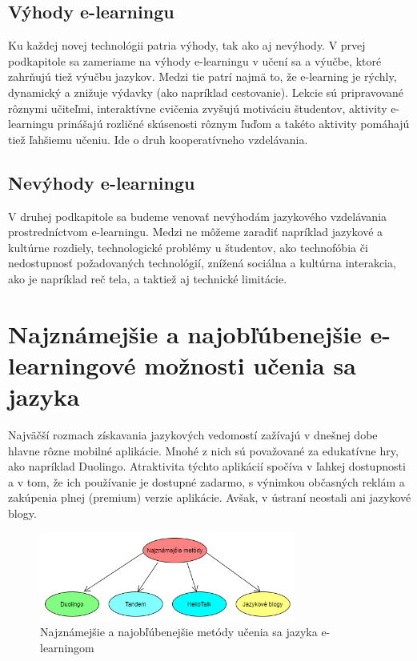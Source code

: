 \documentclass[10pt,oneside,slovak,a4paper]{article}
\begin{document}
\subsection{Výhody e-learningu}%
Ku každej novej technológii patria výhody, tak ako aj nevýhody. V prvej podkapitole sa zameriame na výhody e-learningu v učení sa a výučbe, ktoré zahrňujú tiež výučbu jazykov. Medzi tie patrí najmä to, že e-learning je rýchly, dynamický a znižuje výdavky (ako napríklad cestovanie). \cite{efektivnost}
  Lekcie sú pripravované rôznymi učiteľmi, \cite{efektivnost}
 interaktívne cvičenia zvyšujú motiváciu študentov, \cite{vyhody}
 aktivity e-learningu prinášajú rozličné skúsenosti rôznym ľuďom a takéto aktivity pomáhajú tiež ľahšiemu učeniu. \cite{vyhody}
 Ide o druh kooperatívneho vzdelávania. \cite{efektivnost}

\subsection{Nevýhody e-learningu}%
V druhej podkapitole sa budeme venovať nevýhodám jazykového vzdelávania prostredníctvom e-learningu. Medzi ne môžeme zaradiť napríklad
 jazykové a kultúrne rozdiely, \cite{efektivnost}
 technologické problémy u študentov, ako technofóbia či  nedostupnosť požadovaných technológií, \cite{nevyhody}
 znížená sociálna a kultúrna interakcia, ako je napríklad reč tela,\cite{nevyhody} a taktiež aj 
 technické limitácie.\cite{efektivnost}


\section{Najznámejšie a najobľúbenejšie e-learningové možnosti učenia sa jazyka}%
\label{2}
Najväčší rozmach získavania jazykových vedomostí zažívajú v dnešnej dobe hlavne rôzne mobilné aplikácie. Mnohé z nich sú považované za edukatívne hry, ako napríklad Duolingo. Atraktivita týchto aplikácií spočíva v ľahkej dostupnosti a v tom, že ich používanie je dostupné zadarmo, s výnimkou občasných reklám a zakúpenia plnej (premium) verzie aplikácie. Avšak, v ústraní neostali ani jazykové blogy.

\begin{figure}[h] %
\centering
\includegraphics[width=0.75\textwidth,height=0.15\textheight]{metody.png}
\caption{Najznámejšie a najobľúbenejšie metódy učenia sa jazyka e-learningom}
\label{diagram}
\end{figure}
\end{document}
